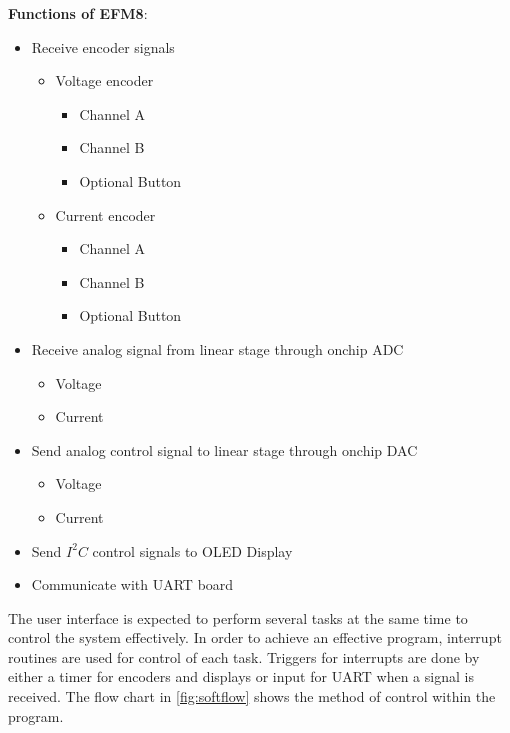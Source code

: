 \documentclass[15pt]{article}
\begin{document}
\begin{singlespace}
\noindent \textbf{Functions of EFM8}:
\vspace{-0.5cm}
\begin{itemize}
    \item Receive encoder signals \begin{itemize}
        \item Voltage encoder  \begin{itemize}
            \item Channel A
            \item Channel B
            \item Optional Button
        \end{itemize}
        \item Current encoder  \begin{itemize}
            \item Channel A
            \item Channel B
            \item Optional Button
        \end{itemize}
    \end{itemize}
    \item Receive analog signal from linear stage through onchip ADC \begin{itemize}
        \item Voltage
        \item Current
    \end{itemize}
    \item Send analog control signal to linear stage through onchip DAC \begin{itemize}
        \item Voltage
        \item Current
    \end{itemize}
    \item Send $I^2C$ control signals to OLED Display
    \item Communicate with UART board
\end{itemize}
\end{singlespace}
The user interface is expected to perform several tasks at the same time to control the system effectively. In order to achieve an effective program, interrupt routines are used for control of each task. Triggers for interrupts are done by either a timer for encoders and displays or input for UART when a signal is received. The flow chart in 
\autoref{fig:softflow} shows the method of control within the program.
\end{document}
